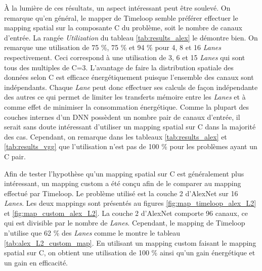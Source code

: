 \documentclass[10pt,letterpaper]{article}
\begin{document}
\begin{multicols}{2}
    À la lumière de ces résultats, un aspect intéressant peut être soulevé. On remarque qu'en général, le mapper de 
    Timeloop semble préférer effectuer le mapping spatial sur la composante C du problème, soit le nombre de canaux d'entrée.
    La rangée \textit{Utilization} du tableau \ref{tab:results_alex} le démontre bien. On remarque une utilisation de 
    75 \%, 75 \% et 94 \% pour 4, 8 et 16 \textit{Lanes} respectivement. Ceci correspond à une utilisation de 3, 6 et 15 \textit{Lanes}
    qui sont tous des multiples de C=3. L'avantage de faire la distribution spatiale des données selon C est efficace énergétiquement
    puisque l'ensemble des canaux sont indépendants. Chaque \textit{Lane} peut donc effectuer ses calculs de façon indépendante des autres
    ce qui permet de limiter les transferts mémoire entre les \textit{Lanes} et à comme effet de minimiser la consommation énergétique.
    Comme la plupart des couches internes d'un DNN possèdent un nombre pair de canaux d'entrée, il serait sans doute intéressant d'utiliser
    un mapping spatial sur C dans la majorité des cas. Cependant, on remarque dans les tableaux \ref{tab:results_alex} et \ref{tab:results_vgg} 
    que l'utilisation n'est pas de 100 \% pour les problèmes ayant un C pair.  

    Afin de tester l'hypothèse qu'un mapping spatial sur C est généralement plus intéressant, un mapping custom a été 
    conçu afin de le comparer au mapping effectué par Timeloop. Le problème utilisé est la couche 2 d'AlexNet sur 16 \textit{Lanes}.
    Les deux mappings sont présentés au figures \ref{fig:map_timeloop_alex_L2} et \ref{fig:map_custom_alex_L2}.
    La couche 2 d'AlexNet comporte 96 canaux, ce qui est divisible par le nombre de \textit{Lanes}. Cependant, le mapping 
    de Timeloop n'utilise que 62 \% des \textit{Lanes} comme le montre le tableau \ref{tab:alex_L2_custom_map}. En utilisant 
    un mapping custom faisant le mapping spatial sur C, on obtient une utilisation de 100 \% ainsi qu'un gain énergétique
    et un gain en efficacité. 


\end{multicols}
\end{document}
